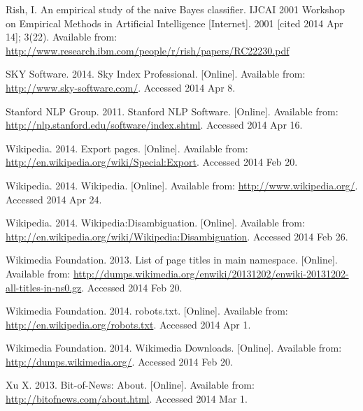 \begin{thebibliography}{99}
Rish, I. An empirical study of the naive Bayes classifier. IJCAI 2001 Workshop on Empirical Methods in Artificial Intelligence [Internet]. 2001 [cited 2014 Apr 14]; 3(22). Available from: \url{http://www.research.ibm.com/people/r/rish/papers/RC22230.pdf}

SKY Software. 2014. Sky Index Professional. [Online]. Available from: \url{http://www.sky-software.com/}. Accessed 2014 Apr 8.

Stanford NLP Group. 2011. Stanford NLP Software. [Online]. Available from: \url{http://nlp.stanford.edu/software/index.shtml}. Accessed 2014 Apr 16.

Wikipedia. 2014. Export pages. [Online]. Available from: \url{http://en.wikipedia.org/wiki/Special:Export}. Accessed 2014 Feb 20.

Wikipedia. 2014. Wikipedia. [Online]. Available from: \url{http://www.wikipedia.org/}. Accessed 2014 Apr 24.

Wikipedia. 2014. Wikipedia:Disambiguation. [Online]. Available from: \url{http://en.wikipedia.org/wiki/Wikipedia:Disambiguation}. Accessed 2014 Feb 26.

Wikimedia Foundation. 2013. List of page titles in main namespace. [Online]. Available from: \url{http://dumps.wikimedia.org/enwiki/20131202/enwiki-20131202-all-titles-in-ns0.gz}. Accessed 2014 Feb 20.

Wikimedia Foundation. 2014. robots.txt. [Online]. Available from: \url{http://en.wikipedia.org/robots.txt}. Accessed 2014 Apr 1.

Wikimedia Foundation. 2014. Wikimedia Downloads. [Online]. Available from: \url{http://dumps.wikimedia.org/}. Accessed 2014 Feb 20.

Xu X. 2013. Bit-of-News: About. [Online]. Available from: \url{http://bitofnews.com/about.html}. Accessed 2014 Mar 1.

\end{thebibliography}